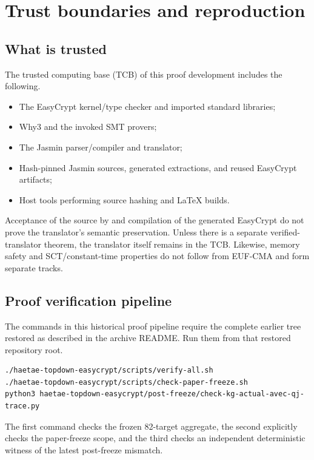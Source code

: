 \section{Trust boundaries and reproduction}
\label{sec:trust-reproduction}

\subsection{What is trusted}

The trusted computing base (TCB) of this proof development includes the following.

\begin{itemize}
  \item The EasyCrypt kernel/type checker and imported standard libraries;
  \item Why3 and the invoked SMT provers;
  \item The Jasmin parser/compiler and  translator;
  \item Hash-pinned Jasmin sources, generated extractions, and reused EasyCrypt artifacts;
  \item Host tools performing source hashing and LaTeX builds.
\end{itemize}

Acceptance of the source by  and compilation of the
generated EasyCrypt do not prove the translator's semantic preservation. Unless
there is a separate verified-translator theorem, the translator itself remains
in the TCB. Likewise, memory safety and SCT/constant-time properties do not follow
from EUF-CMA and form separate tracks.

\subsection{Proof verification pipeline}

The commands in this historical proof pipeline require the complete earlier
tree restored as described in the archive README. Run them from that restored
repository root.

\begin{verbatim}
./haetae-topdown-easycrypt/scripts/verify-all.sh
./haetae-topdown-easycrypt/scripts/check-paper-freeze.sh
python3 haetae-topdown-easycrypt/post-freeze/check-kg-actual-avec-qj-trace.py
\end{verbatim}

The first command checks the frozen 82-target aggregate, the second explicitly
checks the paper-freeze scope, and the third checks an independent deterministic
witness of the latest post-freeze mismatch.

